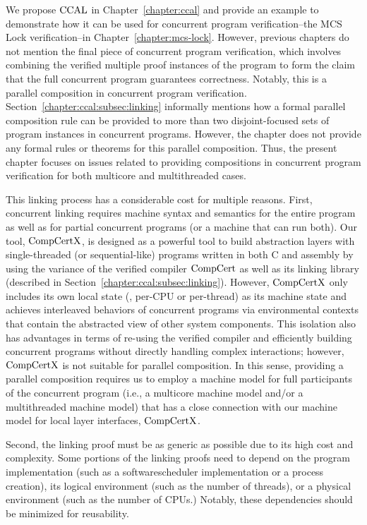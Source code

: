 We propose $\mathrm{CCAL}$ in Chapter~\ref{chapter:ccal} and
provide an example to demonstrate how it can be used for concurrent program verification--the MCS Lock verification--in Chapter~\ref{chapter:mcs-lock}.
However, previous chapters do not mention the final piece of concurrent program verification, 
which involves combining the verified multiple proof instances of the program to form the claim that the full concurrent program guarantees correctness. Notably, this is a parallel composition in concurrent program verification. 
Section~\ref{chapter:ccal:subsec:linking}
informally mentions how a formal parallel composition rule can be provided to more than two disjoint-focused sets of program instances in concurrent programs.
However, the chapter does not provide any formal rules or theorems for this parallel composition. 
Thus, the present chapter focuses on issues related to providing compositions in concurrent program verification for both multicore and multithreaded cases.


This linking process has a considerable cost for multiple reasons. 
First, concurrent linking requires machine syntax and semantics for the entire program as well as for partial concurrent programs 
(or a machine that can run both). 
Our tool, $\mathrm{CompCertX}$, is designed as a powerful tool to build abstraction layers with single-threaded (or sequential-like) programs written in both C and assembly by using the variance of the verified compiler $\mathrm{CompCert}$ as well as its linking library (described in Section~\ref{chapter:ccal:subsec:linking}). However, $\mathrm{CompCertX}$ only includes its own local state (\ie, per-CPU or per-thread) as its machine state and achieves interleaved behaviors of concurrent programs via environmental contexts that contain the abstracted view of other system components. 
This isolation also has advantages in terms of re-using the verified compiler and efficiently building concurrent programs without directly handling complex interactions; however, $\mathrm{CompCertX}$ is not suitable for parallel composition. 
In this sense, providing a parallel composition requires us to employ a machine model for full participants of the concurrent program (i.e., a multicore machine model and/or a multithreaded machine model) that has a close connection with our machine model for  local layer interfaces, $\mathrm{CompCertX}$.

Second, the linking proof must be as generic as possible due to its high cost and complexity.
Some portions of the linking proofs need to depend on the program implementation (such as a softwarescheduler implementation or a process creation), its logical environment (such as the number of threads), or a physical environment (such as the number of CPUs.) 
Notably, these dependencies should be minimized for reusability.

